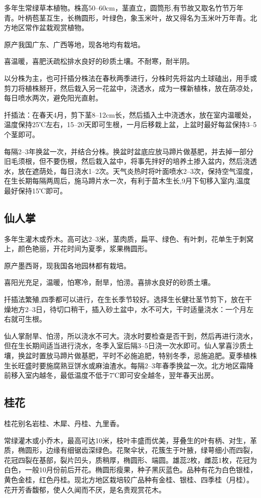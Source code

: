 \documentclass{ctexbook}
\begin{document}
多年生常绿草本植物。株高50--60cm，茎直立，圆筒形,有节故又取名竹节万年青。叶柄苞茎互生，长椭圆形，叶绿色，象玉米叶，故又得名为玉米叶万年青。北方地区常作盆栽观赏植物。

原产我国广东、广西等地，现各地均有栽培。

喜温暖，喜肥沃疏松排水良好的砂质土壤。不耐寒，耐半阴。

以分株为主，也可扦插分株法在春秋两季进行，分株时先将盆内土球磕出，用手或剪刀将植株掰开，然后栽入另一花盆中，浇透水，成为一棵新植株，放在荫凉处，每日喷水两次，避免阳光直射。

扦插法：在春天4月，剪下茎8--12cm长，然后插入土中浇透水，放在室内温暖处，温度保持25℃左右，15--20天即可生根，一月后移栽上盆，上盆时最好每盆保持3--5个茎即可。

每隔2--3年换盆一次，并结合分株。换盆时盆底应放马蹄片做基肥，并去掉一部分旧毛须根，但不要伤根，然后栽入盆中，将事先拌好的培养土掺入盆内，然后浇透水，放在遮荫处，每日浇水1--2次。天气炎热时将叶面喷水2--3次，保持空气湿度，在生长期每隔两周后，施马蹄片水一次，有利于苗木生长,9月下旬移入室内,温度最好保持15℃即可。
\subsection{仙人掌}
多年生灌木或乔木。高可达2--3米，茎肉质，扁平、绿色、有叶刺，花单生于刺窝上，颜色艳丽，开花时间为夏季，浆果椭圆形。

原产墨西哥，现我国各地园林都有栽培。

喜阳光充足，温暖，怕寒冷，耐旱，怕涝。喜排水良好的砂质土壤。

扦插法繁殖,四季都可以进行，在生长季节较好。选择生长健壮茎节剪下，放在干燥地方2--3日，待切口稍干，插入砂土盆中，水不可大，干时适量浇水：一个月左右就可生根。

仙人掌耐旱、怕涝，所以浇水不可大。浇水时要检查是否干到，然后再进行浇水，但在生长期间适当进行浇水，冬季入室后隔3--5日浇一次水即可。仙人掌喜沙质土壤，换盆时置放马蹄片做基肥，平时不必施追肥，特别冬季，忌施追肥。夏季植株生长旺盛时要施腐熟豆饼水或麻油渣水。每隔2--3年春季换盆一次。北方地区霜降前移入室内越冬，最低温度不低于7℃即可安全越冬，翌年春天出房。
\subsection{桂花}
桂花别名岩桂、木犀、丹桂、九里香。

常绿灌木或小乔木，最高可达10米，枝叶丰盛而优美，芽叠生的叶有柄、对生，革质，椭圆形，边缘有细锯齿深绿色。花聚伞状，花簇生于叶腋，绿萼细小而四裂，花冠四裂在基部，裂片凹头，质稍厚，椭圆形、端圆。雄蕊2枚，雌蕊1枚，花冠为白色，一般10月份前后开花。椭圆形瘦果，种子黑灰蓝色。品种有花为白色银桂，黄色金桂，红色丹桂。现北方地区栽培较广品种有金桂、银桂、四季桂（月桂）。花开芳香馥郁，使人久闻而不厌，是名贵观赏花木。
\end{document}

